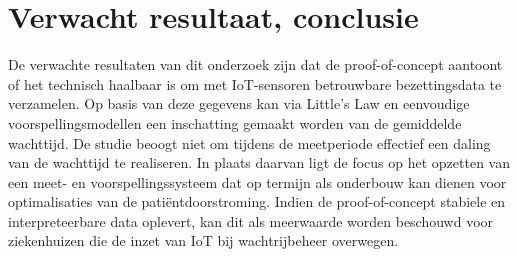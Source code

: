 \section{Verwacht resultaat, conclusie}%
\label{sec:verwachte_resultaten}





De verwachte resultaten van dit onderzoek zijn dat de proof-of-concept aantoont of het technisch haalbaar is om met IoT-sensoren betrouwbare bezettingsdata te verzamelen. Op basis van deze gegevens kan via Little’s Law en eenvoudige voorspellingsmodellen een inschatting gemaakt worden van de gemiddelde wachttijd. De studie beoogt niet om tijdens de meetperiode effectief een daling van de wachttijd te realiseren. In plaats daarvan ligt de focus op het opzetten van een meet- en voorspellingssysteem dat op termijn als onderbouw kan dienen voor optimalisaties van de patiëntdoorstroming. Indien de proof-of-concept stabiele en interpreteerbare data oplevert, kan dit als meerwaarde worden beschouwd voor ziekenhuizen die de inzet van IoT bij wachtrijbeheer overwegen.
